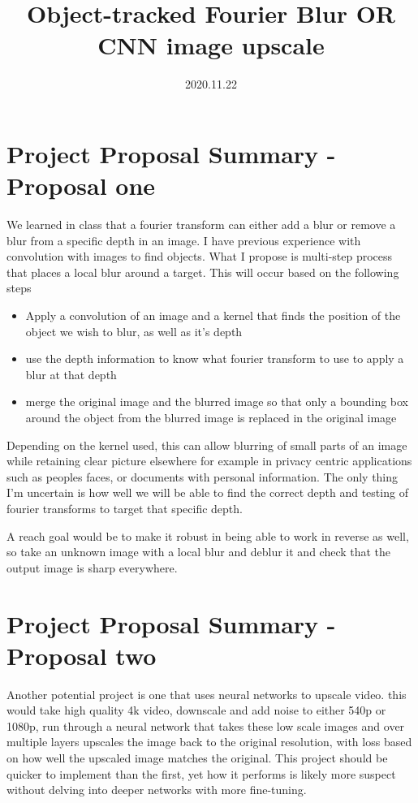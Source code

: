 \documentclass[11pt]{article}
\author{}
\date{2020.11.22}
\title{\vspace{-1cm}Object-tracked Fourier Blur OR CNN image upscale}
\begin{document}
\maketitle
\vspace{-1cm}
\thispagestyle{fancy}

\section*{Project Proposal Summary - Proposal one}

We learned in class that a fourier transform can either add a blur or remove a blur
from a specific depth in an image. I have previous experience with convolution with images to find
objects. What I propose is multi-step process that places a local blur around a target.
This will occur based on the following steps

\begin{itemize}
 \item Apply a convolution of an image and a kernel that finds the position of the object we wish to blur, as well as it's depth
 \item use the depth information to know what fourier transform to use to apply a blur at that depth
 \item merge the original image and the blurred image so that only a bounding box around the object from the blurred
   image is replaced in the original image
\end{itemize}

Depending on the kernel used, this can allow blurring of small parts of an image while retaining clear
picture elsewhere for example in privacy centric applications such as peoples faces, or documents with
personal information. The only thing I'm uncertain is how well we will be able to find the correct depth
and testing of fourier transforms to target that specific depth.

A reach goal would be to make it robust in being able to work in reverse as well, so take an unknown
image with a local blur and deblur it and check that the output image is sharp everywhere.

\section*{Project Proposal Summary - Proposal two}

Another potential project is one that uses neural networks to upscale video. this would take high quality 4k video,
downscale and add noise to either 540p or 1080p, run through a neural network that takes these low scale images and
over multiple layers upscales the image back to the original resolution, with loss based on how well the
upscaled image matches the original. This project should be quicker to implement than the first, yet how it performs
is likely more suspect without delving into deeper networks with more fine-tuning.



\clearpage

\end{document}
